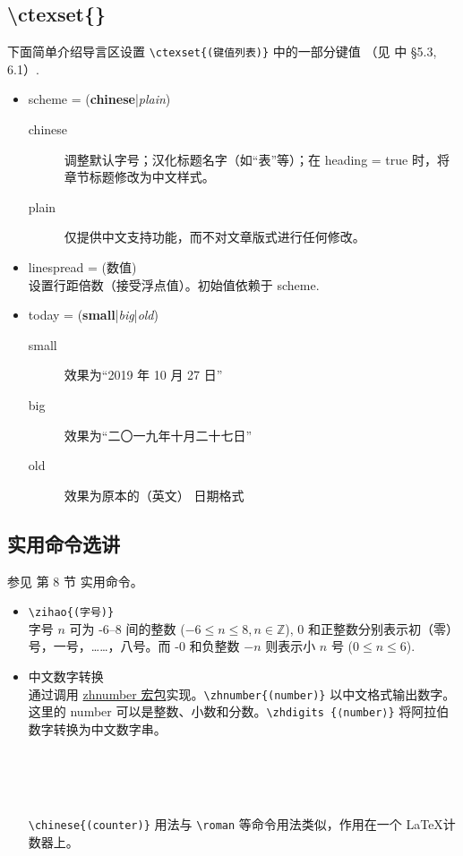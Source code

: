 \subsection{\textbackslash ctexset\{\}}
下面简单介绍导言区设置 \verb|\ctexset{(键值列表)}| 中的一部分键值 （见 \cite{ctex} 中 \S 5.3, 6.1）.
\begin{itemize}
\item scheme = (\textbf{chinese}|\emph{plain})
\begin{description}
  \item[chinese] 调整默认字号；汉化标题名字（如“表”等）；在 heading = true 时，将章节标题修改为中文样式。
  \item[plain] 仅提供中文支持功能，而不对文章版式进行任何修改。 
  \end{description}
\item linespread = (数值)\\
设置行距倍数（接受浮点值）。初始值依赖于 scheme.
\item today = (\textbf{small}|\emph{big}|\emph{old})
\begin{description}
  \item[small] 效果为“2019 年 10 月 27 日”
  \item[big] 效果为“二〇一九年十月二十七日”
  \item[old] 效果为原本的（英文） 日期格式 
\end{description}
\end{itemize}

\subsection{实用命令选讲}
参见 \cite{ctex} 第 8 节 实用命令。
\begin{itemize}
\item \verb|\zihao{(字号)}| \\
字号 $n$ 可为 -6--8 间的整数 ($-6 \leq n \leq 8, n \in \mathbb{Z}$), 0 和正整数分别表示初（零）号，一号，……，八号。而 -0 和负整数 $-n$ 则表示小 $n$ 号 ($0 \leq n \leq 6$).
\item 中文数字转换 \\
通过调用 \href{http://mirrors.ctan.org/macros/latex/contrib/zhnumber/zhnumber.pdf}{zhnumber 宏包}实现。\verb|\zhnumber{(number)}| 以中文格式输出数字。这里的 number 可以是整数、小数和分数。\verb|\zhdigits {⟨number⟩}| 将阿拉伯数字转换为中文数字串。
\begin{sidelst}
 \\
 \\
 \\
\end{sidelst}
\verb|\chinese{(counter)}| 用法与 \verb|\roman| 等命令用法类似，作用在一个 \LaTeX 计数器上。
\end{itemize}

